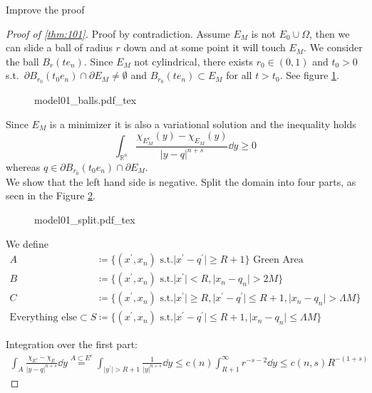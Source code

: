 \begin{TODO}
	Improve the proof
\end{TODO}
\begin{proof}[Proof of \cref{thm:101}]
	Proof by contradiction. Assume \( E_M \) is not \( E_0 \cup \Omega \), then we can
	slide a ball of radius \( r \) down and at some point it will touch \( E_M \). We
	consider the ball \( B_r (t e_n) \). Since \( E_M \) not cylindrical, there exists \(
	r_0 \in (0,1) \) and \( t_0 > 0 \) s.t.\ \( \partial B_{r_0}(t_0 e_n) \cap \partial
	E_M \neq \emptyset \) and \( B_{r_0}(t e_n) \subset E_M \) for all \( t > t_0 \). See
	figure \cref{fig:102}.
	\begin{figure}[h]
		\centering
		\def\svgwidth{0.5\textwidth}
		{model01_balls.pdf_tex}
		\caption{}
		\label{fig:102}
	\end{figure}

	Since \( E_M \) is a minimizer it is also a variational solution and the inequality
	holds
	\[
		\int_{\mathbb{R}^n} \frac{\chi_{E_M^c}(y)-\chi_{E_M} (y)}{\lvert y-q\rvert^{n+s}} \dd{y} \geq 0
	\]
	whereas \( q \in \partial B_{r_0}(t_0 e_n) \cap \partial E_M \). \\
	We show that the left hand side is negative. Split the domain into four parts, as seen
	in the Figure \cref{fig:103}.
	\begin{figure}[h]
		\centering
		\def\svgwidth{0.5\textwidth}
		{model01_split.pdf_tex}
		\caption{}
		\label{fig:103}
	\end{figure}
	We define
	\begin{align*}
		A                                & \coloneqq \{ (x^\prime,x_n) \text{ s.t.} \lvert x^\prime -q^\prime \rvert \geq R+1\} \text{ Green Area} \\
		B                                & \coloneqq \{ (x^\prime,x_n) \text{ s.t.} \lvert x^\prime \rvert < R, \lvert x_n -q_n \rvert > 2M \} \\
		C                                & \coloneqq \{ (x^\prime,x_n) \text{ s.t.} \lvert x^\prime \rvert \geq R, \lvert x^\prime - q^\prime \rvert \leq R+1, \lvert x_n -q_n \rvert > \Lambda M \} \\
		\text{Everything else} \subset S & \coloneqq \{(x^\prime,x_n) \text{ s.t.} \lvert x^\prime -q^\prime \rvert \leq R+1, \lvert x_n -q_n \rvert \leq \Lambda M \}
	\end{align*}


	Integration over the first part:
	\begin{gather*}
		\int_A \frac{\chi_{E^c} -\chi_E}{\lvert y-q\rvert^{n+s}} \dd{y} \overset{A \subset E^c}{ =} \int_{ \lvert y^\prime \rvert > R+1} \frac{1}{\lvert y \rvert^{n+s}} \dd{y} \leq c(n) \int_{R+1}^\infty r^{-s-2} \dd{y} \leq c(n,s) R^{-(1+s)}
	\end{gather*}


\end{proof}
